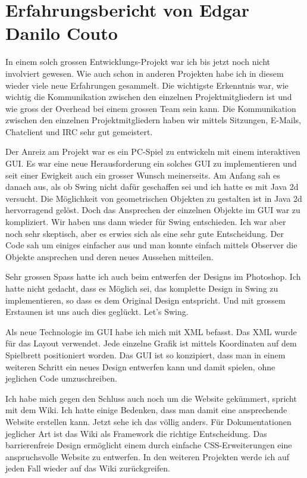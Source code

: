 \documentclass[12pt,halfparskip]{scrartcl}
\begin{document}


\section{Erfahrungsbericht von Edgar Danilo Couto}

In einem solch grossen Entwicklungs-Projekt war ich bis jetzt noch nicht involviert gewesen. Wie auch schon in anderen Projekten habe ich in diesem wieder viele neue Erfahrungen gesammelt. Die wichtigste Erkenntnis war, wie wichtig die Kommunikation zwischen den einzelnen Projektmitgliedern ist und wie gross der Overhead bei einem grossen Team sein kann. Die Kommunikation zwischen den einzelnen Projektmitgliedern haben wir mittels Sitzungen, E-Mails, Chatclient und IRC sehr gut gemeistert.

Der Anreiz am Projekt war es ein PC-Spiel zu entwickeln mit einem interaktiven GUI. Es war eine neue Herausforderung ein solches GUI zu implementieren und seit einer Ewigkeit auch ein grosser Wunsch meinerseits. Am Anfang sah es danach aus, als ob Swing nicht dafür geschaffen sei und ich hatte es mit Java 2d versucht. Die Möglichkeit von geometrischen Objekten zu gestalten ist in Java 2d hervorragend gelöst. Doch das Ansprechen der einzelnen Objekte im GUI war zu kompliziert. Wir haben uns dann wieder für Swing entschieden. Ich war aber noch sehr skeptisch, aber es erwies sich als eine sehr gute Entscheidung. Der Code sah um einiges einfacher aus und man konnte einfach mittels Observer die Objekte ansprechen und deren neues Aussehen mitteilen. 

Sehr grossen Spass hatte ich auch beim entwerfen der Designs im Photoshop. Ich hatte nicht gedacht, dass es Möglich sei, das komplette Design in Swing zu implementieren, so dass es dem Original Design entspricht. Und mit grossem Erstaunen ist uns auch dies geglückt. Let’s Swing. 

Als neue Technologie im GUI habe ich mich mit XML befasst. Das XML wurde für das Layout verwendet. Jede einzelne Grafik ist mittels Koordinaten auf dem Spielbrett positioniert worden. Das GUI ist so konzipiert, dass man in einem weiteren Schritt ein neues Design entwerfen kann und damit spielen, ohne jeglichen Code umzuschreiben.

Ich habe mich gegen den Schluss auch noch um die Website gekümmert, spricht mit dem Wiki. Ich hatte einige Bedenken, dass man damit eine ansprechende Website erstellen kann. Jetzt sehe ich das völlig anders. Für Dokumentationen jeglicher Art ist das Wiki als Framework die richtige Entscheidung. Das barrierenfreie Design ermöglicht einem durch einfache CSS-Erweiterungen eine anspruchsvolle Website zu entwerfen. In den weiteren Projekten werde ich auf jeden Fall wieder auf das Wiki zurückgreifen.
\end{document}
